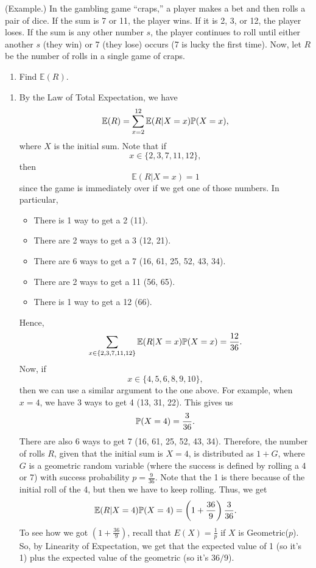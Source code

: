 \begin{mdframed}[]
    (Example.) In the gambling game ``craps,'' a player makes a bet and then rolls a pair of dice. If the sum is 7 or 11, the player wins. If it is 2, 3, or 12, the player loses. If the sum is any other number $s$, the player continues to roll until either another $s$ (they win) or 7 (they lose) occurs (7 is lucky the first time). Now, let $R$ be the number of rolls in a single game of craps.
    \begin{enumerate}
        \item Find $\mathbb{E}(R)$. 
    \end{enumerate}

    \begin{mdframed}[]
        \begin{enumerate}
            \item By the Law of Total Expectation, we have 
            \[\mathbb{E}(R) = \sum_{x = 2}^{12} \mathbb{E}(R | X = x)\mathbb{P}(X = x),\]
            where $X$ is the initial sum. Note that if 
            \[x \in \{2, 3, 7, 11, 12\},\]
            then \[\mathbb{E}(R | X = x) = 1\]
            since the game is immediately over if we get one of those numbers. In particular,
            \begin{itemize}
                \item There is 1 way to get a 2 (11).
                \item There are 2 ways to get a 3 (12, 21).
                \item There are 6 ways to get a 7 (16, 61, 25, 52, 43, 34).
                \item There are 2 ways to get a 11 (56, 65).
                \item There is 1 way to get a 12 (66).
            \end{itemize}
            Hence, 
            \[\sum_{x \in \{2, 3, 7, 11, 12\}} \mathbb{E}(R | X = x) \mathbb{P}(X = x) = \frac{12}{36}.\]
            Now, if \[x \in \{4, 5, 6, 8, 9, 10\},\] then we can use a similar argument to the one above. For example, when $x = 4$, we have 3 ways to get 4 (13, 31, 22). This gives us \[\mathbb{P}(X = 4) = \frac{3}{36}.\] There are also 6 ways to get 7 (16, 61, 25, 52, 43, 34). Therefore, the number of rolls $R$, given that the initial sum is $X = 4$, is distributed as $1 + G$, where $G$ is a geometric random variable (where the success is defined by rolling a 4 or 7) with success probability $p = \frac{9}{36}$. Note that the 1 is there because of the initial roll of the 4, but then we have to keep rolling. Thus, we get  
            \[\mathbb{E}(R | X = 4)\mathbb{P}(X = 4) = \left(1 + \frac{36}{9}\right) \frac{3}{36}.\]
            To see how we got $\left(1 + \frac{36}{9}\right)$, recall that $E(X) = \frac{1}{p}$ if $X$ is Geometric($p$). So, by Linearity of Expectation, we get that the expected value of 1 (so it's 1) plus the expected value of the geometric (so it's $36 / 9$).


\end{enumerate}
\end{mdframed}
\end{mdframed}
